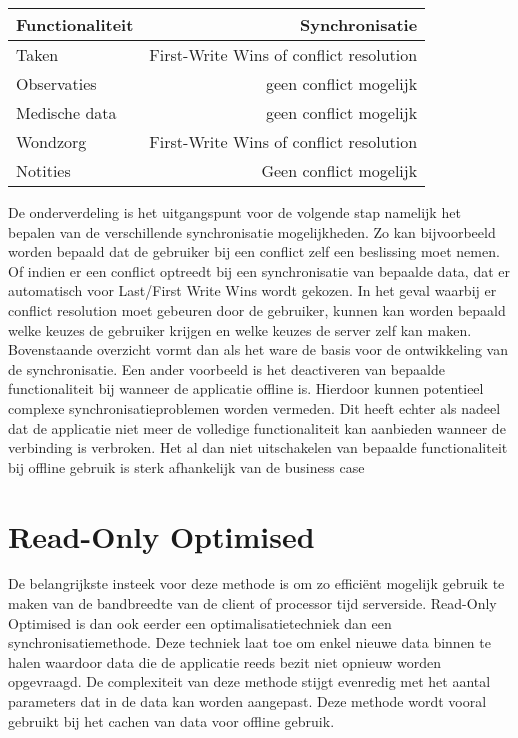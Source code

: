 \begin{center}
    \begin{tabular}{ l | r }
    \hline
    Functionaliteit & Synchronisatie \\ \hline
    Taken & First-Write Wins of conflict resolution \\
    Observaties & geen conflict mogelijk \\
    Medische data & geen conflict mogelijk \\
    Wondzorg & First-Write Wins of conflict resolution \\
    Notities & Geen conflict mogelijk \\
    \hline
    \end{tabular}
\end{center}

De onderverdeling is het uitgangspunt voor de volgende stap namelijk het bepalen van de verschillende synchronisatie mogelijkheden. Zo kan bijvoorbeeld worden bepaald dat de gebruiker bij een conflict zelf een beslissing moet nemen. Of indien er een conflict optreedt bij een synchronisatie van bepaalde data, dat er automatisch voor Last/First Write Wins wordt gekozen. In het geval waarbij er conflict resolution moet gebeuren door de gebruiker, kunnen kan worden bepaald welke keuzes de gebruiker krijgen en welke keuzes de server zelf kan maken. Bovenstaande overzicht vormt dan als het ware de basis voor de ontwikkeling van de synchronisatie. Een ander voorbeeld is het deactiveren van bepaalde functionaliteit bij wanneer de applicatie offline is. Hierdoor kunnen potentieel complexe synchronisatieproblemen worden vermeden. Dit heeft echter als nadeel dat de applicatie niet meer de volledige functionaliteit kan aanbieden wanneer de verbinding is verbroken. Het al dan niet uitschakelen van bepaalde functionaliteit bij offline gebruik is sterk afhankelijk van de business case

\section{Read-Only Optimised}
De belangrijkste insteek voor deze methode is om zo effici\"ent mogelijk gebruik te maken van de bandbreedte van de client of processor tijd serverside. Read-Only Optimised is dan ook eerder een optimalisatietechniek dan een synchronisatiemethode. Deze techniek laat toe om enkel nieuwe data binnen te halen waardoor data die de applicatie reeds bezit niet opnieuw worden opgevraagd. De complexiteit van deze methode stijgt evenredig met het aantal parameters dat in de data kan worden aangepast. Deze methode wordt vooral gebruikt bij het cachen van data voor offline gebruik.
